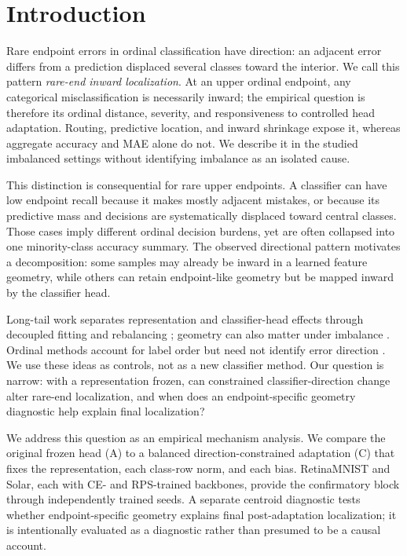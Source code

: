 \section{Introduction}
Rare endpoint errors in ordinal classification have direction: an adjacent error differs from a prediction displaced several classes toward the interior. We call this pattern \emph{rare-end inward localization}. At an upper ordinal endpoint, any categorical misclassification is necessarily inward; the empirical question is therefore its ordinal distance, severity, and responsiveness to controlled head adaptation. Routing, predictive location, and inward shrinkage expose it, whereas aggregate accuracy and MAE alone do not. We describe it in the studied imbalanced settings without identifying imbalance as an isolated cause.

This distinction is consequential for rare upper endpoints. A classifier can have low endpoint recall because it makes mostly adjacent mistakes, or because its predictive mass and decisions are systematically displaced toward central classes. Those cases imply different ordinal decision burdens, yet are often collapsed into one minority-class accuracy summary. The observed directional pattern motivates a decomposition: some samples may already be inward in a learned feature geometry, while others can retain endpoint-like geometry but be mapped inward by the classifier head.

Long-tail work separates representation and classifier-head effects through decoupled fitting and rebalancing \citep{kang2020decoupling,alshammari2022weight,menon2021logit}; geometry can also matter under imbalance \citep{c2am2022angular,zhu2022balanced,yi2025geometry,wang2026alignment}. Ordinal methods account for label order but need not identify error direction \citep{zhu2019smor,lazaro2023bayesian}. We use these ideas as controls, not as a new classifier method. Our question is narrow: with a representation frozen, can constrained classifier-direction change alter rare-end localization, and when does an endpoint-specific geometry diagnostic help explain final localization?

We address this question as an empirical mechanism analysis. We compare the original frozen head (A) to a balanced direction-constrained adaptation (C) that fixes the representation, each class-row norm, and each bias. RetinaMNIST and Solar, each with CE- and RPS-trained backbones, provide the confirmatory block through independently trained seeds. A separate centroid diagnostic tests whether endpoint-specific geometry explains final post-adaptation localization; it is intentionally evaluated as a diagnostic rather than presumed to be a causal account.

